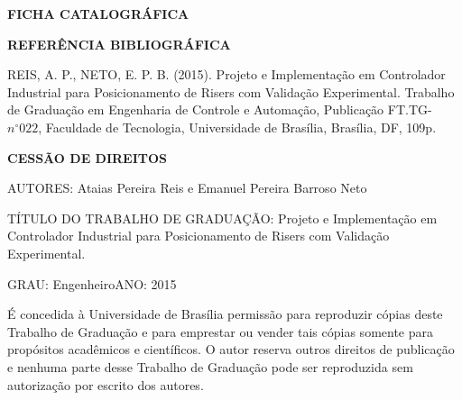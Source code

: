 \noindent \textbf{FICHA CATALOGRÁFICA}

\noindent %

\noindent \medskip{}


\noindent \textbf{REFERÊNCIA BIBLIOGRÁFICA}

REIS, A. P., NETO, E. P. B. (2015). Projeto e Implementação em Controlador Industrial para Posicionamento de Risers com Validação Experimental. Trabalho de Graduação em Engenharia de Controle e Automação, Publicação FT.TG-$n^{\circ}022$, Faculdade de Tecnologia, Universidade
de Brasília, Brasília, DF, 109p.

\noindent \bigskip{}


\noindent \textbf{CESSÃO DE DIREITOS}

\noindent AUTORES: Ataias Pereira Reis e Emanuel Pereira Barroso Neto

TÍTULO DO TRABALHO DE GRADUAÇÃO: Projeto e Implementação em Controlador Industrial para Posicionamento de Risers com Validação Experimental.
\noindent \medskip{}


\noindent GRAU: Engenheiro\hfill{}ANO: 2015\hfill{}

\noindent \medskip{}


É concedida à Universidade de Brasília permissão para reproduzir cópias
deste Trabalho de Graduação e para emprestar ou vender tais cópias
somente para propósitos acadêmicos e científicos. O autor reserva
outros direitos de publicação e nenhuma parte desse Trabalho de Graduação
pode ser reproduzida sem autorização por escrito dos autores.

